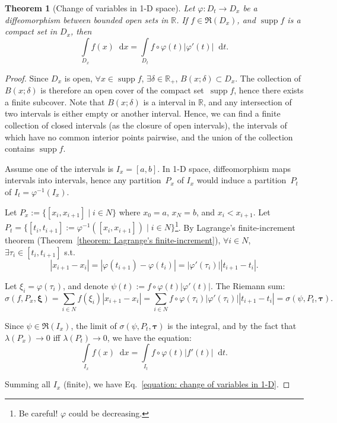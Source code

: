 \documentclass[openany]{book}
\theoremstyle{plain}
\newtheorem{theorem}{Theorem}[section] %
\theoremstyle{definition}
\newcommand{\dif}{\mathop{}\!\mathrm{d}} %
\newcommand*{\bv}{\boldsymbol} %
\DeclareMathOperator{\supp}{supp}
\begin{document}
\begin{theorem}[Change of variables in 1-D space]
	\label{theorem: change of variables in 1-D}
	Let $\varphi \colon D_t \to D_x$ be a diffeomorphism between bounded open sets in $\mathbb R$.
	If $f \in \mathfrak R(D_x)$, and $\supp f$ is a compact set in $D_x$, then
	\begin{equation}
		\label{equation: change of variables in 1-D}
		\int\limits_{D_x} f(x) \dif x = \int\limits_{D_t} f \circ \varphi(t) |\varphi'(t)|\dif t.
	\end{equation}
\end{theorem}
\begin{proof}
	Since $D_x$ is open, $\forall x \in \supp f$, $\exists \delta \in \mathbb R_+$, $B(x; \delta) \subset D_x$. 
	The collection of $B(x; \delta)$ is therefore an open cover of the compact set~$\supp f$, hence there exists a finite subcover. 
	Note that $B(x; \delta)$ is a interval in $\mathbb R$, and any intersection of two intervals is either empty or another interval. 
	Hence, we can find a finite collection of closed intervals (as the closure of open intervals), the intervals of which have no common interior points pairwise, and the union of the collection contains $\supp f$.

	Assume one of the intervals is $I_x = [a, b]$. 
	In 1-D space, diffeomorphism maps intervals into intervals, hence any partition~$P_x$ of $I_x$ would induce a partition~$P_t$ of $I_t = \varphi^{-1}(I_x)$. 
	
	Let $P_x := \{[x_i, x_{i+1}] \mid i \in N\}$ where $x_0 = a$, $x_{N} = b$, and $x_i < x_{i+1}$. 
	Let $P_t = \{[t_i, t_{i+1}] := \varphi^{-1}([x_i, x_{i+1}]) \mid i \in N\}$\footnote{Be careful! $\varphi$ could be decreasing.}.
	By Lagrange's finite-increment theorem (Theorem~\ref{theorem: Lagrange's finite-increment}), $\forall i \in N$, $\exists \tau_i \in [t_i, t_{i+1}]$ s.t.\ 
	\begin{equation*}
		|x_{i+1} - x_i| = |\varphi(t_{i+1}) - \varphi(t_i)| 
			= |\varphi'(\tau_i)| |t_{i+1} - t_i|.
	\end{equation*}

	Let $\xi_i = \varphi(\tau_i)$, and denote $\psi(t) := f \circ \varphi(t)|\varphi'(t)|$. The Riemann sum:
	\begin{equation*}
		\sigma(f, P_x, \bv\xi) = \sum_{i \in N} f(\xi_i)|x_{i+1} - x_i| 
			= \sum_{i \in N} f \circ \varphi(\tau_i) |\varphi'(\tau_i)||t_{i+1} - t_i|
			= \sigma(\psi, P_t, \bv\tau).
	\end{equation*}

	Since $\psi \in \mathfrak R(I_x)$, the limit of $\sigma(\psi, P_t, \bv\tau)$ is the integral, and by the fact that $\lambda(P_x) \to 0$ iff $\lambda(P_t) \to 0$, we have the equation:
	\begin{equation*}
		\int\limits_{I_x} f(x) \dif x = \int\limits_{I_t} f \circ \varphi(t) |f'(t)|\dif t.
	\end{equation*} 

	Summing all $I_x$ (finite), we have Eq.~\ref{equation: change of variables in 1-D}.
\end{proof}
\end{document}
